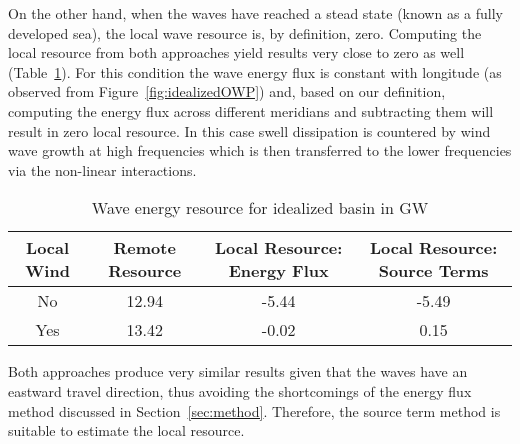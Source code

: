 On the other hand, when the waves have reached a stead state (known as a fully developed sea), the local wave resource is, by definition, zero. Computing the local resource from both approaches yield results very close to zero as well (Table~\ref{table:idealizedResource}). For this condition the wave energy flux is constant with longitude (as observed from Figure~\ref{fig:idealizedOWP}) and, based on our definition, computing the energy flux across different meridians and subtracting them will result in zero local resource. In this case swell dissipation is countered by wind wave growth at high frequencies which is then transferred to the lower frequencies via the non-linear interactions.

\begin{table}[ht]
  \centering
  \begin{tabular}{cccc}
    \hline
    Local Wind & Remote Resource & Local Resource: Energy Flux & Local Resource: Source Terms \\
    \hline
    No  & 12.94 & -5.44 & -5.49 \\
    Yes & 13.42 & -0.02 &  0.15 \\
\hline
  \end{tabular}
  \caption{Wave energy resource for idealized basin in GW}
  \label{table:idealizedResource}
\end{table}

Both approaches produce very similar results given that the waves have an eastward travel direction, thus avoiding the shortcomings of the energy flux method discussed in Section~\ref{sec:method}. Therefore, the source term method is suitable to estimate the local resource.
